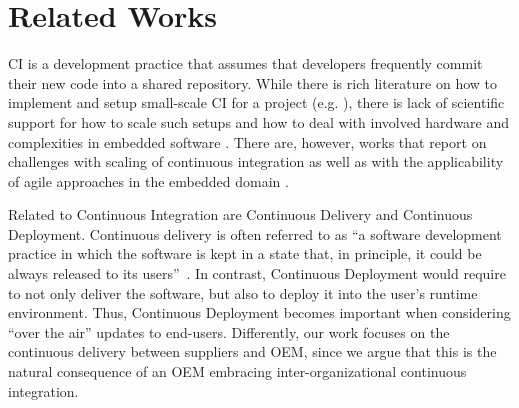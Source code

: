 \section{Related Works}\label{sec:relatedWorks}



 CI %
is a development practice that assumes that developers frequently commit their new code into a shared repository. 
While there is %
rich literature on how to implement and setup small-scale CI for a project (e.g. \cite{Fowler2006,Neely2013}), there is lack of scientific support for how to scale such setups and  how to deal with involved hardware and complexities in embedded software \cite{Debbiche2014}. There are, however, works that report on challenges with scaling of continuous integration \cite{Roberts2004,Rogers2004} as well as with the applicability of agile approaches in the embedded domain \cite{Eklund2012a}.

Related to Continuous Integration are Continuous Delivery and Continuous Deployment.
Continuous delivery is often referred to as ``a software development practice in which the software is kept in a state that, in principle, it could be always released to its users''~\cite{Humble2010}. 
In contrast, Continuous Deployment would require to not only deliver the software, but also to deploy it into the user's runtime environment.
Thus, Continuous Deployment becomes important when considering ``over the air'' updates to end-users.
Differently, our work focuses on the continuous delivery between suppliers and OEM, since we argue that this is the natural consequence of an OEM embracing inter-organizational continuous integration.


